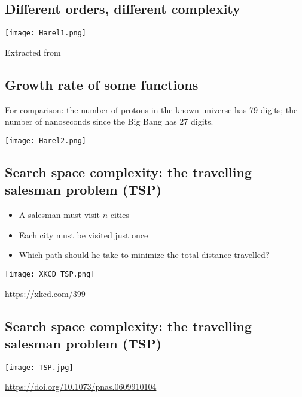 \subsection{Different orders, different complexity}
  \begin{center}
    \texttt{[image: Harel1.png]}
  \end{center}
  Extracted from \cite{harel_algorithmics_2004}


\subsection{Growth rate of some functions}
 
      For comparison: the number of protons in the known universe has 79 digits; the number of nanoseconds since the Big Bang has 27 digits.\cite{harel_algorithmics_2004}
   
      \begin{center}
        \texttt{[image: Harel2.png]}
      \end{center}
 


\subsection{Search space complexity: the travelling salesman problem (TSP)}
 
      \begin{itemize}
        \item A salesman must visit $n$ cities
        \item Each city must be visited just once
        \item Which path should he take to minimize the total distance travelled?
      \end{itemize}
 
      \begin{center}
        \texttt{[image: XKCD\_TSP.png]}
      \end{center}
      \url{https://xkcd.com/399}
 


\subsection{Search space complexity: the travelling salesman problem (TSP)}
  \begin{center}
    \texttt{[image: TSP.jpg]}
  \end{center}
  \url{https://doi.org/10.1073/pnas.0609910104}



